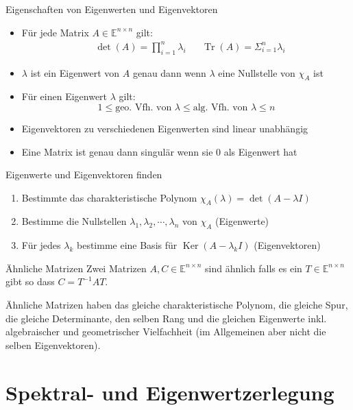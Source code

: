 \documentclass[a4paper,10pt]{article}
\DeclareMathOperator{\Tr}{Tr}
\DeclareMathOperator{\Kernel}{Ker}
\def\E{\mathbb{E}}
\begin{document}
\begin{subbox}{Eigenschaften von Eigenwerten und Eigenvektoren}
  \begin{itemize}
    \item{
      Für jede Matrix $A \in \mathbb{E}^{n \times n}$ gilt:
      \begin{align*}
        & \det(A) = \prod_{i=1}^{n} \lambda_i & & \Tr(A) = \Sigma_{i=1}^n \lambda_i
      \end{align*}
    }
    \item $\lambda$ ist ein Eigenwert von $A$ genau dann wenn $\lambda$ eine Nullstelle von $\chi_A$ ist
    \item Für einen Eigenwert $\lambda$ gilt:{
      $$1 \leq \text{geo. Vfh. von } \lambda \leq \text{alg. Vfh. von } \lambda \leq n$$
    }
    \item Eigenvektoren zu verschiedenen Eigenwerten sind linear unabhängig
    \item Eine Matrix ist genau dann singulär wenn sie $0$ als Eigenwert hat
  \end{itemize}
\end{subbox}

\begin{subbox}{Eigenwerte und Eigenvektoren finden}
  \begin{enumerate}
    \item Bestimmte das charakteristische Polynom $\chi_A(\lambda) = \det(A - \lambda I)$
    \item Bestimme die Nullstellen $\lambda_1, \lambda_2, \cdots, \lambda_n$ von $\chi_A$ (Eigenwerte)
    \item Für jedes $\lambda_k$ bestimme eine Basis für $\Kernel(A - \lambda_k I)$ (Eigenvektoren)
  \end{enumerate}
\end{subbox}

\begin{subbox}{Ähnliche Matrizen}
  Zwei Matrizen $A, C \in \E^{n \times n}$ sind ähnlich falls es ein $T \in \E^{n \times n}$ gibt so dass $C = T^{-1} A T$.

  Ähnliche Matrizen haben das gleiche charakteristische Polynom, die gleiche Spur, die gleiche Determinante, den selben Rang und die gleichen Eigenwerte inkl. algebraischer und geometrischer Vielfachheit (im Allgemeinen aber nicht die selben Eigenvektoren).
\end{subbox}

\section{Spektral- und Eigenwertzerlegung}
\end{document}
